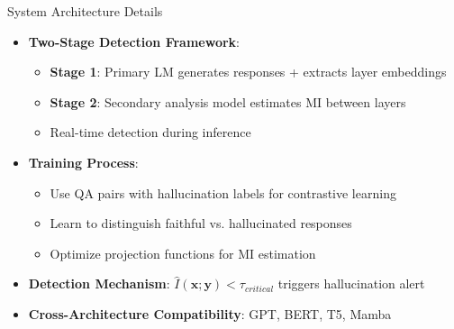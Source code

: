 \documentclass[aspectratio=169]{beamer}
\begin{document}
\begin{frame}{System Architecture Details}
\begin{itemize}
    \item \textbf{Two-Stage Detection Framework}:
    \begin{itemize}
        \item \textbf{Stage 1}: Primary LM generates responses + extracts layer embeddings
        \item \textbf{Stage 2}: Secondary analysis model estimates MI between layers
        \item Real-time detection during inference
    \end{itemize}
    \item \textbf{Training Process}:
    \begin{itemize}
        \item Use QA pairs with hallucination labels for contrastive learning
        \item Learn to distinguish faithful vs. hallucinated responses
        \item Optimize projection functions for MI estimation
    \end{itemize}
    \item \textbf{Detection Mechanism}: $\hat{I}(\mathbf{x}; \mathbf{y}) < \tau_{critical}$ triggers hallucination alert
    \item \textbf{Cross-Architecture Compatibility}: GPT, BERT, T5, Mamba
\end{itemize}
\end{frame}
\end{document}
